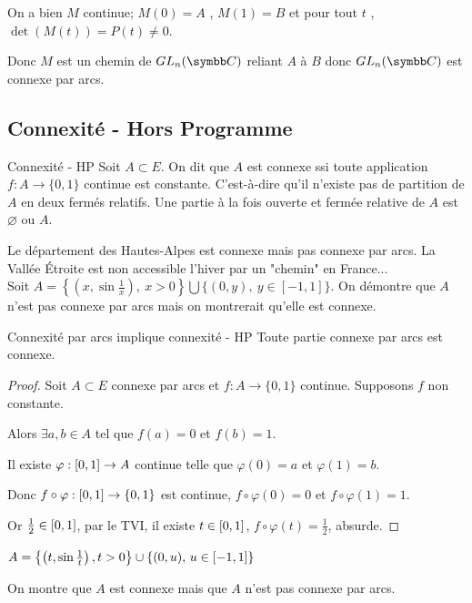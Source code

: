 On a bien $M$ continue; $M(0)=A$ , $M(1)=B$ et pour tout $t$ , $\det(M(t))=P(t) \neq 0$.

Donc $M$ est un chemin de $GL_n(\C)$ reliant $A$ à $B$ donc $GL_n(\C)$ est connexe par arcs.

\subsection{Connexité - Hors Programme}

\begin{definition}{Connexité - HP}{}
    Soit $A \subset E$. 
    On dit que $A$ est connexe ssi toute application $f : A \to \{0, 1\}$ continue est constante. 
    C'est-à-dire qu'il n'existe pas de partition de $A$ en deux fermés relatifs.
    Une partie à la fois ouverte et fermée relative de $A$ est $\varnothing$ ou $A$.
\end{definition}

\begin{exemple}
    Le département des Hautes-Alpes est connexe mais pas connexe par arcs.
    La Vallée Étroite est non accessible l'hiver par un "chemin" en France... \\

    Soit $A = \left\{\left(x, \sin{\frac 1 x}\right),~x > 0\right\} \bigcup \{(0,y),~y\in [-1,1]\}$. On démontre que $A$ n'est pas connexe par arcs mais on montrerait qu'elle est connexe. 
\end{exemple}

\begin{proposition}{Connexité par arcs implique connexité - HP}{}
    Toute partie connexe par arcs est connexe. 
\end{proposition}


\begin{proof}
    Soit $A \subset E$ connexe par arcs et $f : A \to \{0, 1\}$ continue. Supposons $f$ non constante. 

    Alors $\exists a, b \in A$ tel que $f(a) = 0$ et $f(b) = 1$.

    Il existe $\varphi : \left[0, 1\right] \to A$ continue telle que $\varphi(0) = a$ et $\varphi(1) = b$.

    Donc $f \circ \varphi : \left[0, 1\right] \to \{0, 1\}$ est continue, $f \circ \varphi(0) = 0$ et $f \circ \varphi (1) = 1$. 

    Or $\frac 1 2 \in \left[0, 1\right]$, par le TVI, il existe $t \in \left[0, 1\right]$, $f \circ \varphi (t) = \frac 1 2$, absurde. 
\end{proof}

\begin{exemple}
    $A = \left\{\left(t, \sin \frac 1 t\right), t > 0\right\} \cup \{(0, u), \, u \in \left[-1, 1\right]\}$

    On montre que $A$ est connexe mais que $A$ n'est pas connexe par arcs.
\end{exemple}
